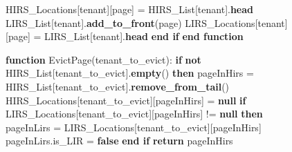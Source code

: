 \begin{figure}[htbp]
\begin{minipage}{\linewidth}
\begin{algorithm}[H]
\begin{algorithmic}
            \STATE \hspace{\algorithmicindent} \hspace{\algorithmicindent} HIRS\_Locations[tenant][page] = HIRS\_List[tenant].\textbf{head}
            \STATE \hspace{\algorithmicindent} \hspace{\algorithmicindent} LIRS\_List[tenant].\textbf{add\_to\_front}(page) 
            \STATE \hspace{\algorithmicindent} \hspace{\algorithmicindent} LIRS\_Locations[tenant][page] = LIRS\_List[tenant].\textbf{head}
            \STATE \hspace{\algorithmicindent} \textbf{end if}
            \STATE \textbf{end function}

            \STATE
            \STATE \textbf{function} EvictPage(tenant\_to\_evict):
            \STATE \hspace{\algorithmicindent} \textbf{if} \textbf{not} HIRS\_List[tenant\_to\_evict].\textbf{empty}() \textbf{then}
            \STATE \hspace{\algorithmicindent} \hspace{\algorithmicindent} pageInHirs = HIRS\_List[tenant\_to\_evict].\textbf{remove\_from\_tail}()
            \STATE \hspace{\algorithmicindent} \hspace{\algorithmicindent} HIRS\_Locations[tenant\_to\_evict][pageInHirs] = \textbf{null}
            \STATE \hspace{\algorithmicindent} \hspace{\algorithmicindent} \textbf{if} LIRS\_Locations[tenant\_to\_evict][pageInHirs] != \textbf{null} \textbf{then}
            \STATE \hspace{\algorithmicindent} \hspace{\algorithmicindent} \hspace{\algorithmicindent} pageInLirs = LIRS\_Locations[tenant\_to\_evict][pageInHirs]
            \STATE \hspace{\algorithmicindent} \hspace{\algorithmicindent} \hspace{\algorithmicindent} pageInLirs.is\_LIR = \textbf{false}
            \STATE \hspace{\algorithmicindent} \hspace{\algorithmicindent} \textbf{end if}
            \STATE \hspace{\algorithmicindent} \hspace{\algorithmicindent} \textbf{return} pageInHirs

\end{algorithmic}
\end{algorithm}
\end{minipage}
\end{figure}
